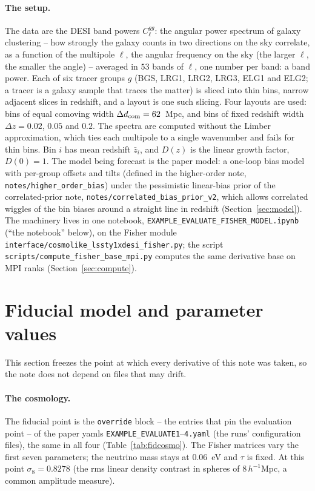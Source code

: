 \documentclass[11pt]{article}
\newcommand{\us}{\_\allowbreak}
\begin{document}
\paragraph{The setup.}
The data are the DESI band powers $C_\ell^{gg}$: the angular power
spectrum of galaxy clustering -- how strongly the galaxy counts in two
directions on the sky correlate, as a function of the multipole
$\ell$, the angular frequency on the sky (the larger $\ell$, the
smaller the angle) -- averaged in $53$ bands of $\ell$, one number per
band: a band power.  Each of six tracer groups $g$ (BGS, LRG1, LRG2,
LRG3, ELG1 and ELG2; a tracer is a galaxy sample that traces the
matter) is sliced into thin bins, narrow adjacent slices in redshift,
and a layout is one such slicing.  Four layouts are used: bins of
equal comoving width $\Delta d_{\rm com} = 62$~Mpc, and bins of fixed
redshift width $\Delta z = 0.02$, $0.05$ and $0.2$.  The spectra are
computed without the Limber approximation, which ties each multipole
to a single wavenumber and fails for thin bins.  Bin $i$ has mean
redshift $\bar{z}_i$, and $D(z)$ is the linear growth factor,
$D(0) = 1$.  The
model being forecast is the paper model: a one-loop bias model with
per-group offsets and tilts (defined in the higher-order note,
\texttt{notes/higher\us order\us bias}) under the pessimistic
linear-bias prior of the correlated-prior note,
\texttt{notes/correlated\us bias\us prior\us v2}, which allows
correlated wiggles of the bin biases around a straight line in
redshift (Section~\ref{sec:model}).  The machinery lives in one
notebook, \texttt{EXAMPLE\us EVALUATE\us FISHER\us MODEL.ipynb} (``the
notebook'' below), on the Fisher module
\texttt{interface/cosmolike\us lssty1xdesi\us fisher.py}; the script
\texttt{scripts/compute\us fisher\us base\us mpi.py} computes the same
derivative base on MPI ranks (Section~\ref{sec:compute}).

\section{Fiducial model and parameter values}
\label{sec:fiducial}

This section freezes the point at which every derivative of this note
was taken, so the note does not depend on files that may drift.

\paragraph{The cosmology.}
The fiducial point is the \texttt{override} block -- the entries that
pin the evaluation point -- of the paper yamls
\texttt{EXAMPLE\us EVALUATE1}--\texttt{4.yaml} (the runs' configuration
files), the same in all four
(Table~\ref{tab:fidcosmo}).  The Fisher matrices vary the first seven
parameters; the neutrino mass stays at $0.06$~eV and $\tau$ is fixed.
At this point $\sigma_8 = 0.8278$ (the rms linear density contrast in
spheres of $8\,h^{-1}$Mpc, a common amplitude measure).
\end{document}
